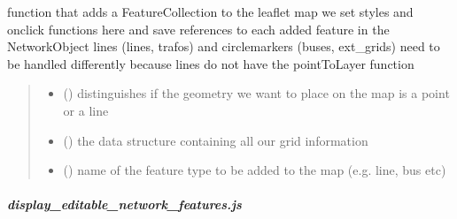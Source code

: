 \documentclass[letterpaper,10pt,english]{sphinxmanual}
\begin{document}
\begin{fulllineitems}
\label{\detokenize{docs_gui/js_api/network_editor/generate_editable_network:addGeoJSONtoMap}}
\pysigstartsignatures
{}
\pysigstopsignatures
\sphinxAtStartPar
function that adds a FeatureCollection to the leaflet map
we set styles and onclick functions here and save references to each added feature in the NetworkObject
lines (lines, trafos) and circlemarkers (buses, ext\_grids) need to be handled differently because lines do not have the pointToLayer function
\begin{quote}\begin{description}
\begin{itemize}
\item {} 
\sphinxAtStartPar
{} () \textendash{} distinguishes if the geometry we want to place on the map is a point or a line

\item {} 
\sphinxAtStartPar
{} () \textendash{} the data structure containing all our grid information

\item {} 
\sphinxAtStartPar
{} () \textendash{} name of the feature type to be added to the map (e.g. line, bus etc)

\end{itemize}

\end{description}\end{quote}

\end{fulllineitems}


\sphinxstepscope


\subparagraph{display\_editable\_network\_features.js}
\label{\detokenize{docs_gui/js_api/network_editor/display_editable_network_features:display-editable-network-features-js}}\label{\detokenize{docs_gui/js_api/network_editor/display_editable_network_features::doc}}
\end{document}
